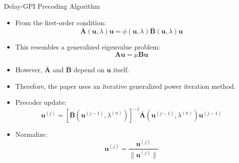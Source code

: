 \documentclass{beamer}
\begin{document}
\begin{frame}{Delay-GPI Precoding Algorithm}

\begin{itemize}
    \item From the first-order condition:
    \[
        \bar{\mathbf{A}}(\mathbf{u},\lambda)\mathbf{u}
        =
        \phi(\mathbf{u},\lambda)
        \bar{\mathbf{B}}(\mathbf{u},\lambda)\mathbf{u}
    \]

    \item This resembles a generalized eigenvalue problem:
    \[
        \mathbf{A}\mathbf{u}=\mu \mathbf{B}\mathbf{u}
    \]

    \item However, $\bar{\mathbf{A}}$ and $\bar{\mathbf{B}}$ depend on $\mathbf{u}$ itself.

    \item Therefore, the paper uses an iterative generalized power iteration method.

    \item Precoder update:
    \[
        \mathbf{u}^{(j)}
        =
        \left[
        \bar{\mathbf{B}}(\mathbf{u}^{(j-1)},\lambda^{(n)})
        \right]^{-1}
        \bar{\mathbf{A}}(\mathbf{u}^{(j-1)},\lambda^{(n)})
        \mathbf{u}^{(j-1)}
    \]

    \item Normalize:
    \[
        \mathbf{u}^{(j)}
        =
        \frac{\mathbf{u}^{(j)}}{\|\mathbf{u}^{(j)}\|}
    \]

\end{itemize}

\end{frame}
\end{document}
